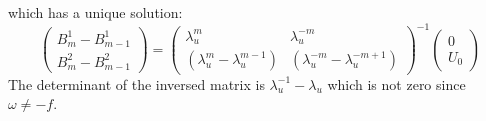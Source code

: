 \begin{appendix}
\begin{itemize}
which has a unique solution:
\begin{equation}
	\begin{pmatrix}
B_m^1 - B_{m-1}^1\\
B_m^2 - B_{m-1}^2
	\end{pmatrix}
	=
	\begin{pmatrix}
		\lambda_u^m & \lambda_u^{-m} \\
		(\lambda_u^m - \lambda_u^{m-1})  & 
		(\lambda_u^{-m} - \lambda_u^{-m+1})
	\end{pmatrix}^{-1}
	\begin{pmatrix}
		0 \\ U_0
	\end{pmatrix}
\end{equation}
The determinant of the inversed matrix is
$\lambda_u^{-1} - \lambda_u$ which is not zero since
$\omega\neq -f$.

\end{itemize}
\end{appendix}
